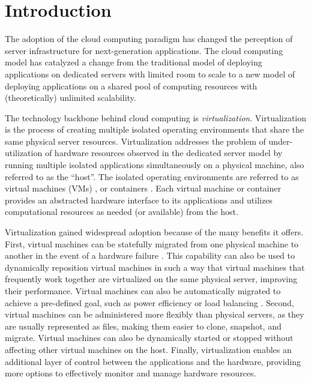 \chapter{Introduction}


The adoption of the cloud computing paradigm has changed the perception of server infrastructure for next-generation applications. The cloud computing model has catalyzed a change from the traditional model of deploying applications on dedicated servers with limited room to scale to a new model of deploying applications on a shared pool of computing resources with (theoretically) unlimited scalability\cite{unlimited_scale}.


The technology backbone behind cloud computing is \emph{virtualization}. Virtualization is the process of creating multiple isolated operating environments that share the same physical server resources. Virtualization addresses the problem of under-utilization of hardware resources observed in the dedicated server model by running multiple isolated applications simultaneously on a physical machine, also referred to as the ``host''. The isolated operating environments are referred to as  virtual machines (VMs) \cite{5346711}, or containers \cite{lxc}. Each virtual machine or container provides an abstracted hardware interface to its applications and utilizes computational resources as needed (or available) from the host. 


Virtualization gained widespread adoption because of the many benefits it offers. First, virtual machines can be statefully migrated from one physical machine to another in the event of a hardware failure \cite{live_migration}. This capability can also be used to dynamically reposition virtual machines in such a way that virtual machines that frequently work together are virtualized on the same physical server, improving their performance. Virtual machines can also be automatically migrated to achieve a pre-defined goal, such as power efficiency or load balancing \cite{auto_vm_migration}. Second, virtual machines can be administered more flexibly than physical servers, as they are usually represented as files, making them easier to clone, snapshot, and migrate. Virtual machines can also be dynamically started or stopped without affecting other virtual machines on the host. Finally, virtualization enables an additional layer of control between the applications and the hardware, providing more options to effectively monitor and manage hardware resources.


